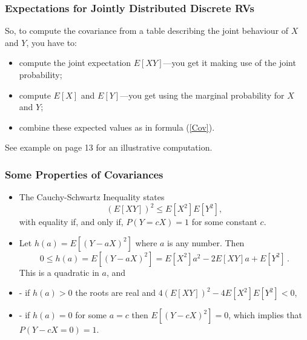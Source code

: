 \documentclass[notes=show,handout]{beamer}\usepackage[]{graphicx}\usepackage[]{color}
\newenvironment{stepitemize}{\begin{itemize}[<+->]}{\end{itemize} }
\renewcommand{\Pr}{P}
\begin{document}
\begin{frame}
\frametitle{Expectations for Jointly Distributed Discrete RVs}

So, to compute the covariance from a table describing the joint behaviour of $X$ and $Y$, you have to:

\begin{itemize}
\item compute the joint expectation $E[XY]$---you get it making use of the joint probability; \vspace{0.2cm}
\item compute $E[X]$ and $E[Y]$---you get using the marginal probability for $X$ and $Y$; \vspace{0.2cm}
\item combine these expected values as in formula (\ref{Cov}).

\end{itemize}

See example on page 13 for an illustrative computation.

\end{frame}



\begin{frame}%

\frametitle{Some Properties of Covariances }


    \begin{stepitemize}

\item The Cauchy-Schwartz Inequality states
$$(E\left[ XY\right])^2\leq E\left[ X^2\right]E\left[ Y^2\right],
$$
with equality if, and only if, $\Pr(Y=cX)=1$ for some constant $c$.

\vspace{0.4cm}

\item Let $h(a)=E[(Y-aX)^2]$ where $a$ is any number. Then
$$
0\leq h(a)=E[(Y-aX)^2]=E[X^2]a^2-2E[XY]a+E[Y^2]\,.
$$
This is a quadratic in $a$, and
\item[-] if $h(a)>0$ the roots are real and $4(E[XY])^2-4E[X^2]E[Y^2]<0$,
\item[-] if $h(a)=0$ for some $a=c$ then $E[(Y-cX)^2]=0$, which implies that $\Pr(Y-cX=0)=1$.
\end{stepitemize}
\end{frame}%
\end{document}
